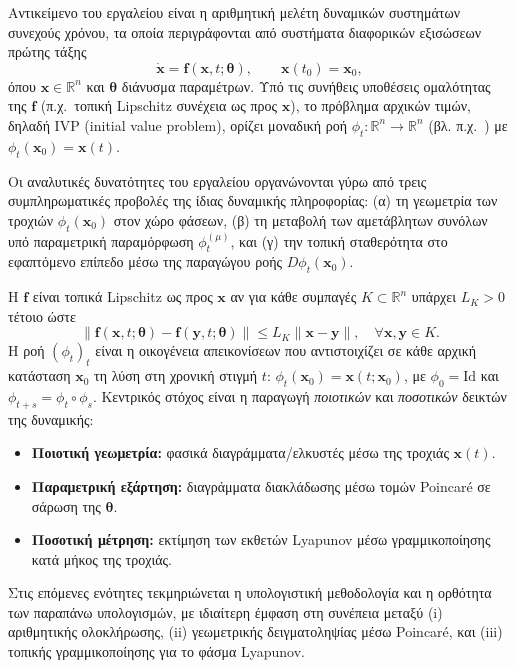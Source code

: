 \documentclass[11pt,a4paper]{report}
\newcommand{\params}{\symbf{\theta}}
\begin{document}
Αντικείμενο του εργαλείου είναι η αριθμητική μελέτη δυναμικών συστημάτων συνεχούς χρόνου,
τα οποία περιγράφονται από συστήματα διαφορικών εξισώσεων πρώτης τάξης
\begin{equation}
\dot{\mathbf{x}}=\mathbf{f}(\mathbf{x},t;\params),
\qquad
\mathbf{x}(t_0)=\mathbf{x}_0,
\end{equation}
όπου $\mathbf{x}\in\mathbb{R}^n$ και $\params$ διάνυσμα παραμέτρων.
Υπό τις συνήθεις υποθέσεις ομαλότητας της $\mathbf{f}$ (π.χ.\ τοπική Lipschitz συνέχεια ως προς $\mathbf{x}$), το πρόβλημα αρχικών τιμών, δηλαδή IVP (initial value problem), ορίζει μοναδική ροή $\phi_t:\mathbb{R}^n\to\mathbb{R}^n$ (βλ. π.χ.\ \cite[Ch.~I.1-I.2]{hairer_wanner}) με
$\phi_t(\mathbf{x}_0)=\mathbf{x}(t)$.

Οι αναλυτικές δυνατότητες του εργαλείου οργανώνονται γύρω από τρεις συμπληρωματικές προβολές της ίδιας δυναμικής πληροφορίας:
(α) τη γεωμετρία των τροχιών $\phi_t(\mathbf{x}_0)$ στον χώρο φάσεων,
(β) τη μεταβολή των αμετάβλητων συνόλων υπό παραμετρική παραμόρφωση $\phi_t^{(\mu)}$,
και (γ) την τοπική σταθερότητα στο εφαπτόμενο επίπεδο μέσω της παραγώγου ροής $D\phi_t(\mathbf{x}_0)$.

Η $\mathbf{f}$ είναι τοπικά Lipschitz ως προς $\mathbf{x}$ αν για κάθε συμπαγές $K\subset\mathbb{R}^n$ υπάρχει $L_K>0$ τέτοιο ώστε
\begin{equation}
\|\mathbf{f}(\mathbf{x},t;\params)-\mathbf{f}(\mathbf{y},t;\params)\| \le L_K \|\mathbf{x}-\mathbf{y}\|,\quad \forall \mathbf{x},\mathbf{y}\in K.
\end{equation}
Η ροή $(\phi_t)_t$ είναι η οικογένεια απεικονίσεων που αντιστοιχίζει σε κάθε αρχική κατάσταση
$\mathbf{x}_0$ τη λύση στη χρονική στιγμή $t$: $\phi_t(\mathbf{x}_0)=\mathbf{x}(t;\mathbf{x}_0)$, με $\phi_0=\mathrm{Id}$
και $\phi_{t+s}=\phi_t\circ\phi_s$.
Κεντρικός στόχος είναι η παραγωγή \emph{ποιοτικών} και \emph{ποσοτικών} δεικτών της δυναμικής:
\begin{itemize}
\item \textbf{Ποιοτική γεωμετρία:} φασικά διαγράμματα/ελκυστές μέσω της τροχιάς $\mathbf{x}(t)$.
\item \textbf{Παραμετρική εξάρτηση:} διαγράμματα διακλάδωσης μέσω τομών Poincaré σε σάρωση της $\params$.
\item \textbf{Ποσοτική μέτρηση:} εκτίμηση των εκθετών Lyapunov μέσω γραμμικοποίησης κατά μήκος της τροχιάς.
\end{itemize}

Στις επόμενες ενότητες τεκμηριώνεται η υπολογιστική μεθοδολογία και η ορθότητα των παραπάνω υπολογισμών,
με ιδιαίτερη έμφαση στη συνέπεια μεταξύ (i) αριθμητικής ολοκλήρωσης, (ii) γεωμετρικής δειγματοληψίας μέσω Poincaré,
και (iii) τοπικής γραμμικοποίησης για το φάσμα Lyapunov.
\end{document}
